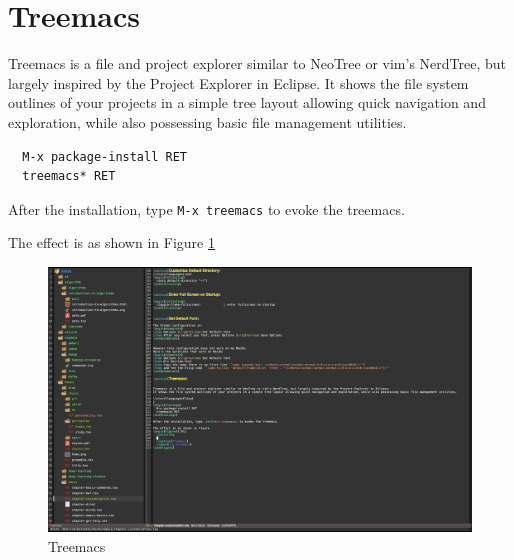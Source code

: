 \section{Treemacs}


Treemacs is a file and project explorer similar to NeoTree or vim’s NerdTree, but largely inspired by the Project Explorer in Eclipse.
It shows the file system outlines of your projects in a simple tree layout allowing quick navigation and exploration, while also possessing basic file management utilities.

\lstset{language=Elisp}
\begin{lstlisting}
  M-x package-install RET
  treemacs* RET
\end{lstlisting}

After the installation, type \verb|M-x treemacs| to evoke the treemacs.

The effect is as shown in Figure \ref{fig:treemacs}
\begin{figure}[!ht]
  \centering
  \includegraphics[width=\textwidth]{treemacs}
  \caption{Treemacs}
  \label{fig:treemacs}
\end{figure}
